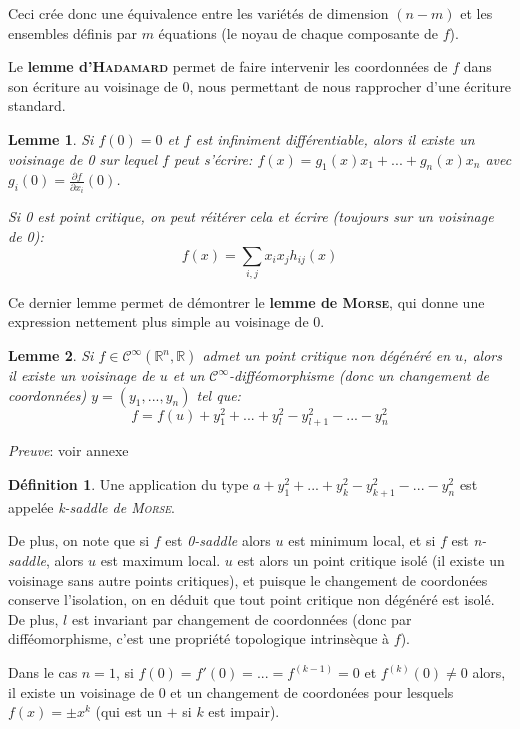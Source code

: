 \documentclass{article}
\newcommand{\cinf}{\mathcal{C}^\infty}
\newcommand{\R}{\mathbb{R}}
\newtheorem{lemm}{Lemme}
\theoremstyle{definition}
\newtheorem{defn}{Définition}
\begin{document}
Ceci crée donc une équivalence entre les variétés de dimension $(n-m)$ et les ensembles définis par $m$ équations (le noyau de chaque composante de $f$).

Le \textbf{lemme d'\textsc{Hadamard}} permet de faire intervenir les coordonnées de $f$ dans son écriture au voisinage de $0$, nous permettant de nous rapprocher d'une écriture standard.

\begin{lemm}
Si $f(0)=0$ et $f$ est infiniment différentiable, alors il existe un voisinage de 0 sur lequel $f$ peut s'écrire: $f(x)=g_1(x)x_1+...+g_n(x)x_n$ avec $g_i(0) = \frac{\partial f}{\partial x_i}(0)$.

Si 0 est point critique, on peut réitérer cela et écrire (toujours sur un voisinage de 0): $$f(x)=\sum_{i,j} x_ix_jh_{ij}(x)$$
\end{lemm}

Ce dernier lemme permet de démontrer le \textbf{lemme de \textsc{Morse}}, qui donne une expression nettement plus simple au voisinage de $0$.

\begin{lemm}
	Si $f\in\cinf(\R^n,\R)$ admet un point critique non dégénéré en $u$, alors il existe un voisinage de $u$ et un $\cinf$-difféomorphisme (donc un changement de coordonnées) $y=(y_1,...,y_n)$ tel que: $$f=f(u)+y_1^2+...+y_l^2-y_{l+1}^2-...-y_n^2$$
\end{lemm}

\textit{Preuve}: voir annexe

\begin{defn}
Une application du type $a+y_1^2+...+y_k^2-y_{k+1}^2-...-y_n^2$ est appelée \textit{k-saddle de \textsc{Morse}}.
\end{defn}

De plus, on note que si $f$ est \textit{0-saddle} alors $u$ est minimum local, et si $f$ est \textit{n-saddle}, alors $u$ est maximum local.
$u$ est alors un point critique isolé (il existe un voisinage sans autre points critiques), et puisque le changement de coordonées conserve l'isolation, on en déduit que tout point critique non dégénéré est isolé. De plus, $l$ est invariant par changement de coordonnées (donc par difféomorphisme, c'est une propriété topologique intrinsèque à $f$).

Dans le cas $n=1$, si $f(0)=f'(0)=...=f^{(k-1)}=0$ et $f^{(k)}(0)\neq 0$ alors, il existe un voisinage de 0 et un changement de coordonées pour lesquels $f(x)=\pm x^k$ (qui est un $+$ si $k$ est impair).
\end{document}
